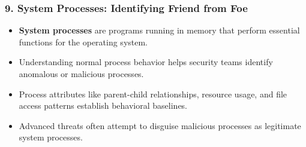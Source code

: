 \documentclass{beamer}
\begin{document}
	\begin{frame}[fragile]
		\frametitle{9. System Processes: Identifying Friend from Foe}
		\begin{itemize}
			\item \textbf{System processes} are programs running in memory that perform essential functions for the operating system.
			\item Understanding normal process behavior helps security teams identify anomalous or malicious processes.
			\item Process attributes like parent-child relationships, resource usage, and file access patterns establish behavioral baselines.
			\item Advanced threats often attempt to disguise malicious processes as legitimate system processes.
		\end{itemize}
		
		\scriptsize
	\end{frame}
	
\end{document}
